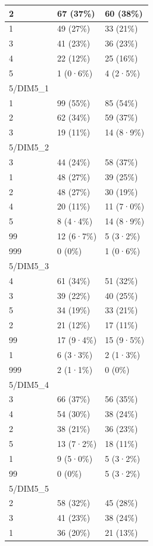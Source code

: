 \documentclass[
]{book}
\begin{document}
\begin{tabular}{l|l|l}
\hline
2 & 67 (37\%) & 60 (38\%)\\
\hline
1 & 49 (27\%) & 33 (21\%)\\
\hline
3 & 41 (23\%) & 36 (23\%)\\
\hline
4 & 22 (12\%) & 25 (16\%)\\
\hline
5 & 1 (0·6\%) & 4 (2·5\%)\\
\hline
5/DIM5\_1 &  & \\
\hline
1 & 99 (55\%) & 85 (54\%)\\
\hline
2 & 62 (34\%) & 59 (37\%)\\
\hline
3 & 19 (11\%) & 14 (8·9\%)\\
\hline
5/DIM5\_2 &  & \\
\hline
3 & 44 (24\%) & 58 (37\%)\\
\hline
1 & 48 (27\%) & 39 (25\%)\\
\hline
2 & 48 (27\%) & 30 (19\%)\\
\hline
4 & 20 (11\%) & 11 (7·0\%)\\
\hline
5 & 8 (4·4\%) & 14 (8·9\%)\\
\hline
99 & 12 (6·7\%) & 5 (3·2\%)\\
\hline
999 & 0 (0\%) & 1 (0·6\%)\\
\hline
5/DIM5\_3 &  & \\
\hline
4 & 61 (34\%) & 51 (32\%)\\
\hline
3 & 39 (22\%) & 40 (25\%)\\
\hline
5 & 34 (19\%) & 33 (21\%)\\
\hline
2 & 21 (12\%) & 17 (11\%)\\
\hline
99 & 17 (9·4\%) & 15 (9·5\%)\\
\hline
1 & 6 (3·3\%) & 2 (1·3\%)\\
\hline
999 & 2 (1·1\%) & 0 (0\%)\\
\hline
5/DIM5\_4 &  & \\
\hline
3 & 66 (37\%) & 56 (35\%)\\
\hline
4 & 54 (30\%) & 38 (24\%)\\
\hline
2 & 38 (21\%) & 36 (23\%)\\
\hline
5 & 13 (7·2\%) & 18 (11\%)\\
\hline
1 & 9 (5·0\%) & 5 (3·2\%)\\
\hline
99 & 0 (0\%) & 5 (3·2\%)\\
\hline
5/DIM5\_5 &  & \\
\hline
2 & 58 (32\%) & 45 (28\%)\\
\hline
3 & 41 (23\%) & 38 (24\%)\\
\hline
1 & 36 (20\%) & 21 (13\%)\\

\end{tabular}
\end{document}
